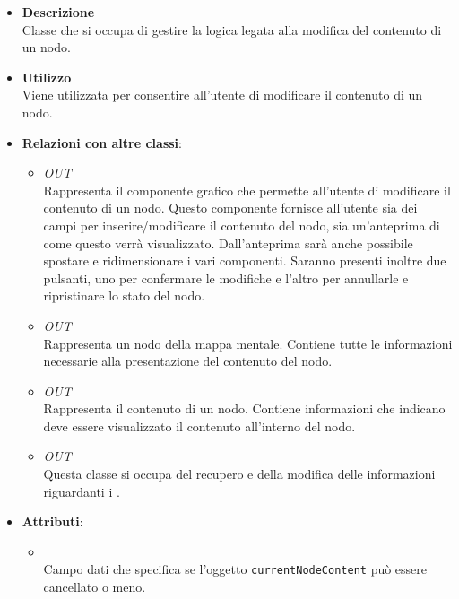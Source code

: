\begin{itemize}
\item \textbf{Descrizione}\\
Classe che si occupa di gestire la logica legata alla modifica del contenuto di un nodo.
\item \textbf{Utilizzo}\\
Viene utilizzata per consentire all'utente di modificare il contenuto di un nodo.
\item \textbf{Relazioni con altre classi}:
\begin{itemize}
\item \textit{OUT} \hyperref[\nogloxy{Premi::Front-End::Directives::premiNodeContentsEditor}]{}\\
Rappresenta il componente grafico che permette all’utente di modificare il contenuto di un nodo. Questo componente fornisce all’utente sia dei campi per inserire/modificare il contenuto del nodo, sia un’anteprima di come questo verrà visualizzato. Dall’anteprima sarà anche possibile spostare e ridimensionare i vari componenti.
Saranno presenti inoltre due pulsanti, uno per confermare le modifiche e l’altro per annullarle e ripristinare lo stato del nodo.
\item \textit{OUT} \hyperref[\nogloxy{Premi::Front-End::Model::Node}]{}\\
Rappresenta un nodo della mappa mentale. Contiene tutte le informazioni necessarie alla presentazione del contenuto del nodo.
\item \textit{OUT} \hyperref[\nogloxy{Premi::Front-End::Model::NodeContent}]{}\\
Rappresenta il contenuto di un nodo. Contiene informazioni che indicano deve essere visualizzato il contenuto all’interno del nodo.
\item \textit{OUT} \hyperref[\nogloxy{Premi::Front-End::Services::ProjectService}]{}\\
Questa classe si occupa del recupero e della modifica delle informazioni riguardanti i .
\end{itemize}
\item \textbf{Attributi}:
\begin{itemize}
\item {}
\\ Campo dati che specifica se l'oggetto \texttt{currentNodeContent} può essere cancellato o meno.

\end{itemize}
\end{itemize}
